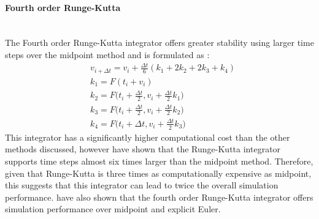 \paragraph{Fourth order Runge-Kutta}\leavevmode\\
The Fourth order Runge-Kutta integrator offers greater stability using larger time steps over the midpoint method and is formulated as \parencite[3]{Wang2009a}:
\begin{equation}
\begin{split}
\label{eq:4th order rk}
  &v_{i + \Delta t} = v_{i} + \frac{\Delta t}{6}(k_{1} + 2k_{2} + 2k_{3} +  k_{4})
  \\&k_{1} = F(t_{i} + v_{i})
  \\&k_{2} = F\bigg(t_{i} + \frac{\Delta t}{2}, v_{i} + \frac{\Delta t}{2}k_{1}\bigg)
  \\&k_{3} = F\bigg(t_{i} + \frac{\Delta t}{2}, v_{i} + \frac{\Delta t}{2}k_{2}\bigg)
  \\&k_{4} = F\bigg(t_{i} + \Delta t, v_{i} + \frac{\Delta t}{2}k_{3}\bigg)
\end{split}
\end{equation}
This integrator has a significantly higher computational cost than the other methods discussed, however \textcite[4]{Volino2001} have shown that the Runge-Kutta integrator supports time steps almost six times larger than the midpoint method. Therefore, given that Runge-Kutta is three times as computationally expensive as midpoint, this suggests that this integrator can lead to twice the overall simulation performance. \textcite[4]{Wang2009a} have also shown that the fourth order Runge-Kutta integrator offers simulation performance over midpoint and explicit Euler.

